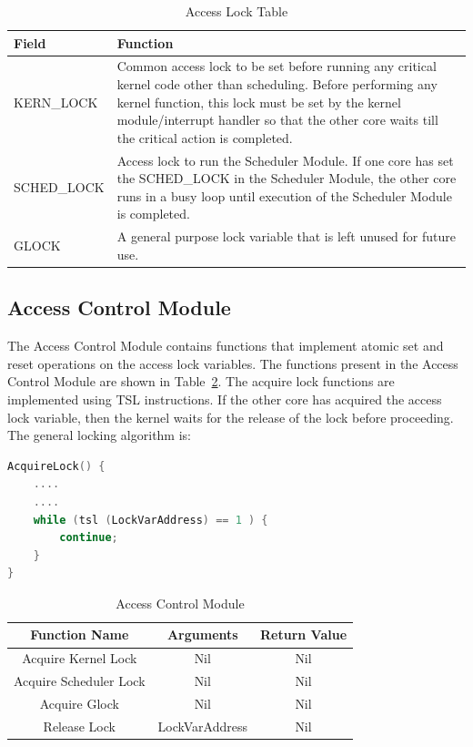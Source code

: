 \documentclass[12pt]{report}
\begin{document}
\begin{table}[h!]
    \centering
    \begin{tabular}{|m{7em}|m{24em}|}
        \hline
        \textbf{Field} & \textbf{Function} \\ [0.5ex]
        \hline
        KERN\_LOCK & Common access lock to be set before running any critical kernel code other than scheduling. Before performing any kernel function, this lock must be set by the kernel module/interrupt handler so that the other core waits till the critical action is completed. \\
        \hline
        SCHED\_LOCK & Access lock to run the Scheduler Module. If one core has set the SCHED\_LOCK in the Scheduler Module, the other core runs in a busy loop until execution of the Scheduler Module is completed. \\
        \hline
        GLOCK & A general purpose lock variable that is left unused for future use. \\
        \hline
    \end{tabular}
    \caption{Access Lock Table}
    \label{altable}
\end{table}

\subsection{Access Control Module}
The Access Control Module contains functions that implement atomic set and reset operations on the access lock variables. The functions present in the Access Control Module are shown in Table~\ref{mod8}. The acquire lock functions are implemented using TSL instructions. If the other core has acquired the access lock variable, then the kernel waits for the release of the lock before proceeding. The general locking algorithm is:

\begin{lstlisting}[language=C]
AcquireLock() {
    ....
    ....
    while (tsl (LockVarAddress) == 1 ) {
        continue;
    }
}
\end{lstlisting}

\begin{table}[h!]
    \centering
    \begin{tabular}{|c|c|c|}
        \hline
        \textbf{Function Name} & \textbf{Arguments} & \textbf{Return Value} \\ [0.5ex]
        \hline
        Acquire Kernel Lock & Nil & Nil \\
        \hline
        Acquire Scheduler Lock & Nil & Nil \\
        \hline
        Acquire Glock & Nil & Nil \\
        \hline
        Release Lock & LockVarAddress & Nil \\
        \hline
    \end{tabular}
    \caption{Access Control Module}
    \label{mod8}
\end{table}
\end{document}
